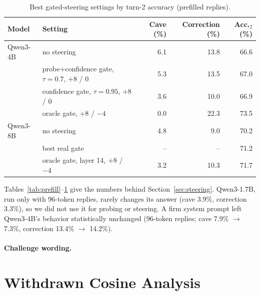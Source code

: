 \begin{table}[tbp]
\centering
\small
\caption{Best gated-steering settings by turn-2 accuracy (prefilled replies).}
\label{tab:gate}
\begin{tabular}{llrrr}
\toprule
Model & Setting & Cave (\%) & Correction (\%) & Acc.$_2$ (\%) \\
\midrule
Qwen3-4B & no steering & 6.1 & 13.8 & 66.6 \\
 & probe+confidence gate, $\tau=0.7$, $+8$ / 0 & 5.3 & 13.5 & 67.0 \\
 & confidence gate, $\tau=0.95$, $+8$ / 0 & 3.6 & 10.0 & 66.9 \\
 & oracle gate, $+8$ / $-4$ & 0.0 & 22.3 & 73.5 \\
\midrule
Qwen3-8B & no steering & 4.8 & 9.0 & 70.2 \\
 & best real gate & -- & -- & 71.2 \\
 & oracle gate, layer 14, $+8$ / $-4$ & 3.2 & 10.3 & 71.7 \\
\bottomrule
\end{tabular}
\end{table}

Tables~\ref{tab:prefill}--\ref{tab:gate} give the numbers behind Section~\ref{sec:steering}. Qwen3-1.7B, run only with 96-token replies, rarely changes its answer (cave 3.9\%, correction 3.3\%), so we did not use it for probing or steering. A firm system prompt left Qwen3-4B's behavior statistically unchanged (96-token replies; cave 7.9\% $\to$ 7.3\%, correction 13.4\% $\to$ 14.2\%).

\paragraph{Challenge wording.}

\section{Withdrawn Cosine Analysis}
\label{app:cosine}

